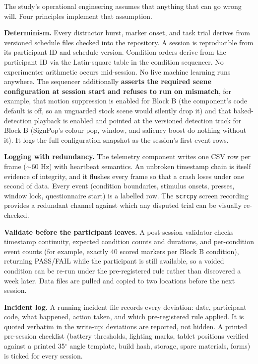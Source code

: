 The study's operational engineering assumes that anything that can go wrong will. Four principles
implement that assumption.

\textbf{Determinism.} Every distractor burst, marker onset, and task trial derives from versioned schedule
files checked into the repository. A session is reproducible from its participant ID and schedule
version. Condition orders derive from the participant ID via the Latin-square table in the condition
sequencer. No experimenter arithmetic occurs mid-session. No live machine learning runs anywhere.
The sequencer additionally \textbf{asserts the required scene configuration at session start and refuses
to run on mismatch}, for example, that motion suppression is enabled for Block B (the component's
code default is off, so an unguarded stock scene would silently drop it) and that baked-detection
playback is enabled and pointed at the versioned detection track for Block B (SignPop's colour pop,
window, and saliency boost do nothing without it). It logs the full configuration snapshot as
the session's first event rows.

\textbf{Logging with redundancy.} The telemetry component writes one CSV row per frame ($\sim$60 Hz) with
heartbeat semantics. An unbroken timestamp chain is itself evidence of integrity, and it flushes every
frame so that a crash loses under one second of data. Every event (condition boundaries, stimulus
onsets, presses, window lock, questionnaire start) is a labelled row. The \verb|scrcpy| screen recording
provides a redundant channel against which any disputed trial can be visually re-checked.

\textbf{Validate before the participant leaves.} A post-session validator checks timestamp continuity,
expected condition counts and durations, and per-condition event counts (for example, exactly 40
scored markers per Block B condition), returning PASS/FAIL while the participant is still available,
so a voided condition can be re-run under the pre-registered rule rather than discovered a week
later. Data files are pulled and copied to two locations before the next session.

\textbf{Incident log.} A running incident file records every deviation: date, participant code, what
happened, action taken, and which pre-registered rule applied. It is quoted verbatim in the write-up:
deviations are reported, not hidden. A printed pre-session checklist (battery thresholds, lighting
marks, tablet positions verified against a printed 35$^{\circ}$ angle template, build hash, storage, spare
materials, forms) is ticked for every session.

